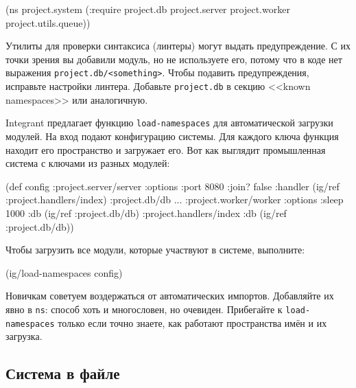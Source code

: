 \begin{english}
  \begin{clojure}
(ns project.system
  (:require project.db
            project.server
            project.worker
            project.utils.queue))
  \end{clojure}
\end{english}


Утилиты для проверки синтаксиса (линтеры) могут выдать предупреждение. С их
точки зрения вы добавили модуль, но не используете его, потому что в коде нет
выражения \verb|project.db/<something>|. Чтобы подавить предупреждения,
исправьте настройки линтера. Добавьте \verb|project.db| в секцию <<known
namespaces>> или аналогичную.


Integrant предлагает функцию \verb|load-namespaces| для автоматической
загрузки модулей. На вход подают конфигурацию системы. Для каждого ключа функция
находит его пространство и загружает его. Вот как выглядит промышленная система
с ключами из разных модулей:

\begin{english}
  \begin{clojure}
(def config
  {:project.server/server
   {:options {:port 8080 :join? false}
    :handler (ig/ref :project.handlers/index)}
   :project.db/db {...}
   :project.worker/worker
   {:options {:sleep 1000}
    :db      (ig/ref :project.db/db)}
   :project.handlers/index
   {:db (ig/ref :project.db/db)}})
  \end{clojure}
\end{english}

\noindent
Чтобы загрузить все модули, которые участвуют в системе, выполните:

\begin{english}
  \begin{clojure}
(ig/load-namespaces config)
  \end{clojure}
\end{english}

Новичкам советуем воздержаться от автоматических импортов. Добавляйте их явно в
\verb|ns|: способ хоть и многословен, но очевиден. Прибегайте к
\verb|load-namespaces| только если точно знаете, как работают пространства
имён и их загрузка.

\subsection{Система в файле}

